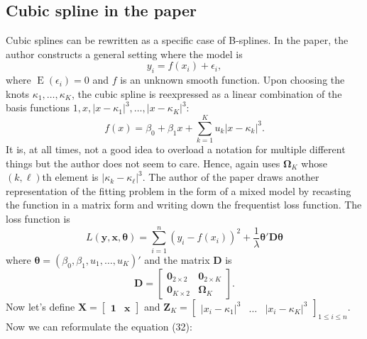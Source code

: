 \documentclass[11pt]{article}
\newcommand{\bs}{\boldsymbol}
\newcommand{\opn}{\operatorname}
\begin{document}
\subsection{Cubic spline in the paper}
Cubic splines can be rewritten as a specific case of B-splines. In the paper, the author constructs a general setting where the model is
\begin{equation}
  y_{i} = f\left(x_{i}\right) + \epsilon_{i},
\end{equation}
where $\opn{E}\left(\epsilon_{i}\right) = 0$ and $f$ is an unknown smooth function. Upon choosing the knots $\kappa_{1}, \ldots , \kappa_{K}$, the cubic spline is reexpressed as a linear combination of the basis functions $1, x, \left|x-\kappa_{1}\right|^{3}, \ldots , \left|x-\kappa_{K}\right|^{3}$:
\begin{equation}
  f\left(x\right) = \beta_{0} + \beta_{1}x + \sum_{k=1}^{K}u_{k}\left|x-\kappa_{k}\right|^{3}.
\end{equation}
It is, at all times, not a good idea to overload a notation for multiple different things but the author does not seem to care. Hence, again uses $\bs{\Omega}_{K}$ whose $\left(k,\ell\right)$th element is $\left|\kappa_{k}-\kappa_{\ell}\right|^{3}$. The author of the paper draws another representation of the fitting problem in the form of a mixed model by recasting the function in a matrix form and writing down the frequentist loss function. The loss function is
\begin{equation}
  L\left(\bs{y},\bs{x},\bs{\theta}\right) = \sum_{i=1}^{n}\left(y_{i}-f\left(x_{i}\right)\right)^{2} + \frac{1}{\lambda}\bs{\theta}'\bs{D\theta}
\end{equation}
where $\bs{\theta}= \left(\beta_{0},\beta_{1}, u_{1}, \ldots, u_{K}\right)'$ and the matrix $\bs{D}$ is
\begin{equation}
  \bs{D} = \begin{bmatrix}\bs{0}_{2\times 2} & \bs{0}_{2\times K}\\ \bs{0}_{K \times 2} & \bs{\Omega}_{K}  \end{bmatrix}.
\end{equation}
Now let's define $\bs{X} = \begin{bmatrix} \bs{1} & \bs{x}\end{bmatrix}$ and $\bs{Z}_{K} = \begin{bmatrix} \left|x_{i}-\kappa_{1}\right|^{3} & \ldots & \left|x_{i} - \kappa_{K}\right|^{3}\end{bmatrix}_{1\leq i \leq n}$. Now we can reformulate the equation (32):
\end{document}
